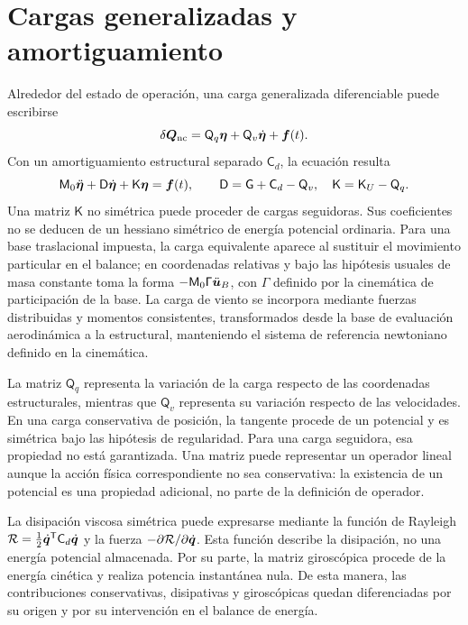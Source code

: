 \section{Cargas generalizadas y amortiguamiento}
Alrededor del estado de operación, una carga generalizada diferenciable puede escribirse
\begin{equation}
 \delta\bm{Q}_{\rm nc}=\mathsf Q_q\bm{\eta}+
 \mathsf Q_v\dot{\bm{\eta}}+\bm{f}(t).
\end{equation}
Con un amortiguamiento estructural separado $\mathsf C_d$, la ecuación resulta
\begin{equation}
 \mathsf M_0\ddot{\bm{\eta}}+\mathsf D\dot{\bm{\eta}}
 +\mathsf K\bm{\eta}=\bm{f}(t),\qquad
 \mathsf D=\mathsf G+\mathsf C_d-\mathsf Q_v,
 \quad\mathsf K=\mathsf K_U-\mathsf Q_q.
 \label{eq:finaldynamic}
\end{equation}
Una matriz $\mathsf K$ no simétrica puede proceder de cargas seguidoras. Sus coeficientes no se deducen de un hessiano simétrico de energía potencial ordinaria. Para una base traslacional impuesta, la carga equivalente aparece al sustituir el movimiento particular en el balance; en coordenadas relativas y bajo las hipótesis usuales de masa constante toma la forma $-\mathsf M_0\mathsf\Gamma\ddot{\bm{u}}_B$, con $\mathsf\Gamma$ definido por la cinemática de participación de la base. La carga de viento se incorpora mediante fuerzas distribuidas y momentos consistentes, transformados desde la base de evaluación aerodinámica a la estructural, manteniendo el sistema de referencia newtoniano definido en la cinemática.

La matriz $\mathsf Q_q$ representa la variación de la carga respecto de las coordenadas estructurales, mientras que $\mathsf Q_v$ representa su variación respecto de las velocidades. En una carga conservativa de posición, la tangente procede de un potencial y es simétrica bajo las hipótesis de regularidad. Para una carga seguidora, esa propiedad no está garantizada. Una matriz puede representar un operador lineal aunque la acción física correspondiente no sea conservativa: la existencia de un potencial es una propiedad adicional, no parte de la definición de operador.

La disipación viscosa simétrica puede expresarse mediante la función de Rayleigh $\mathcal R=\tfrac12\dot{\bm{q}}^{\mathsf T}\mathsf C_d\dot{\bm{q}}$ y la fuerza $-\partial\mathcal R/\partial\dot{\bm{q}}$. Esta función describe la disipación, no una energía potencial almacenada. Por su parte, la matriz giroscópica procede de la energía cinética y realiza potencia instantánea nula. De esta manera, las contribuciones conservativas, disipativas y giroscópicas quedan diferenciadas por su origen y por su intervención en el balance de energía.

